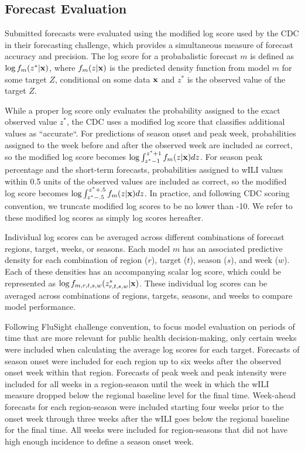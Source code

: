 \documentclass{article}\usepackage[]{graphicx}\usepackage[]{color}
\begin{document}
\subsection*{Forecast Evaluation}
Submitted forecasts were evaluated using the modified log score used by the CDC in their forecasting challenge, which provides a simultaneous measure of forecast accuracy and precision. The log score for a probabalistic forecast $m$ is defined as $\log f_m(z^*|\bf{x})$, where $f_m(z|\bf{x})$ is the predicted density function from model $m$ for some target $Z$, conditional on some data $\bf{x}$ and $z^*$ is the observed value of the target $Z$. 

While a proper log score only evaluates the probability assigned to the exact observed value $z^*$, the CDC uses a modified log score that classifies additional values as ``accurate``. For predictions of season onset and peak week, probabilities assigned to the week before and after the observed week are included as correct, so the modified log score becomes $\log \int_{z^* -1}^{z^* + 1} f_m(z|{\bf{x}})dz$. For season peak percentage and the short-term forecasts, probabilities assigned to wILI values within 0.5 units of the observed values are included as correct, so the modified log score becomes $\log \int_{z^* -.5}^{z^* + .5} f_m(z|{\bf{x}})dz$. In practice, and following CDC scoring convention, we truncate modified log scores to be no lower than -10. We refer to these modified log scores as simply log scores hereafter.

Individual log scores can be averaged across different combinations of forecast regions, target, weeks, or seasons. Each model $m$ has an associated predictive density for each combination of region ($r$), target ($t$), season ($s$), and week ($w$). Each of these densities has an accompanying scalar log score, which could be represented as $\log f_{m,r,t,s,w}(z^*_{r,t,s,w}|\bf{x})$. These individual log scores can be averaged across combinations of regions, targets, seasons, and weeks to compare model performance.

Following FluSight challenge convention, to focus model evaluation on periods of time that are more relevant for public health decision-making, only certain weeks were included when calculating the average log scores for each target.
Forecasts of season onset were included for each region up to six weeks after the observed onset week within that region.
Forecasts of peak week and peak intensity were included for all weeks in a region-season until the week in which the wILI measure dropped below the regional baseline level for the final time. 
Week-ahead forecasts for each region-season were included starting four weeks prior to the onset week through three weeks after the wILI goes below the regional baseline for the final time.
All weeks were included for region-seasons that did not have high enough incidence to define a season onset week.
\end{document}
